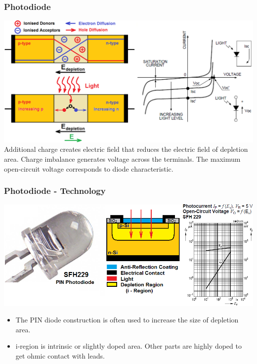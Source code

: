 \documentclass{beamer}
\begin{document}
	\begin{frame}
    \frametitle{Photodiode}
		\includegraphics[scale=0.25]{obr02_char.png}\\
		Additional charge creates electric field that reduces the electric field of depletion area. Charge imbalance generates voltage across the terminals. The maximum open-circuit voltage corresponds to diode characteristic.
	\end{frame}
	\begin{frame}
    \frametitle{Photodiode - Technology}
		\begin{center}
			\includegraphics[scale=0.35]{obr01_fotodioda.png}
		\end{center}
		
		\begin{itemize}
			\item The PIN diode construction is often used to increase the size of depletion area.
			\item i-region is intrinsic or slightly doped area. Other parts are highly doped to get ohmic contact with leads.
		\end{itemize}
	\end{frame}
\end{document}
